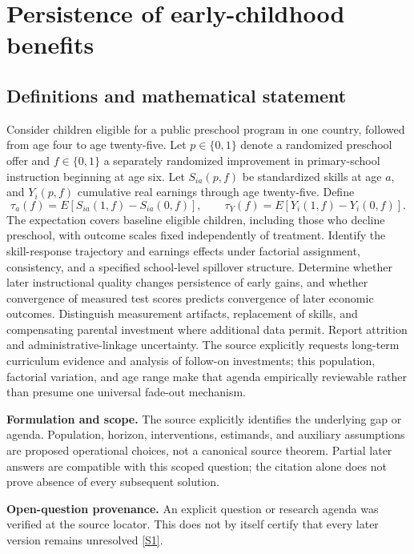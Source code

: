 \documentclass[11pt]{article}
\newcommand{\sref}[2]{\hyperlink{source:#1:#2}{[S#2]}}
\begin{document}
\section*{Persistence of early-childhood benefits}\label{30007732}
\subsection{Definitions and mathematical statement}
Consider children eligible for a public preschool program in one country, followed from age four to age twenty-five. Let \(p\in\{0,1\}\) denote a randomized preschool offer and \(f\in\{0,1\}\) a separately randomized improvement in primary-school instruction beginning at age six. Let \(S_{ia}(p,f)\) be standardized skills at age \(a\), and \(Y_i(p,f)\) cumulative real earnings through age twenty-five. Define
\[\tau_a(f)=E[S_{ia}(1,f)-S_{ia}(0,f)],\qquad\tau_Y(f)=E[Y_i(1,f)-Y_i(0,f)].\]
The expectation covers baseline eligible children, including those who decline preschool, with outcome scales fixed independently of treatment. Identify the skill-response trajectory and earnings effects under factorial assignment, consistency, and a specified school-level spillover structure. Determine whether later instructional quality changes persistence of early gains, and whether convergence of measured test scores predicts convergence of later economic outcomes. Distinguish measurement artifacts, replacement of skills, and compensating parental investment where additional data permit. Report attrition and administrative-linkage uncertainty. The source explicitly requests long-term curriculum evidence and analysis of follow-on investments; this population, factorial variation, and age range make that agenda empirically reviewable rather than presume one universal fade-out mechanism.

\par\textbf{Formulation and scope.} The source explicitly identifies the underlying gap or agenda. Population, horizon, interventions, estimands, and auxiliary assumptions are proposed operational choices, not a canonical source theorem. Partial later answers are compatible with this scoped question; the citation alone does not prove absence of every subsequent solution.

\par\textbf{Open-question provenance.} An explicit question or research agenda was verified at the source locator. This does not by itself certify that every later version remains unresolved \sref{30007732}{1}.
\end{document}
